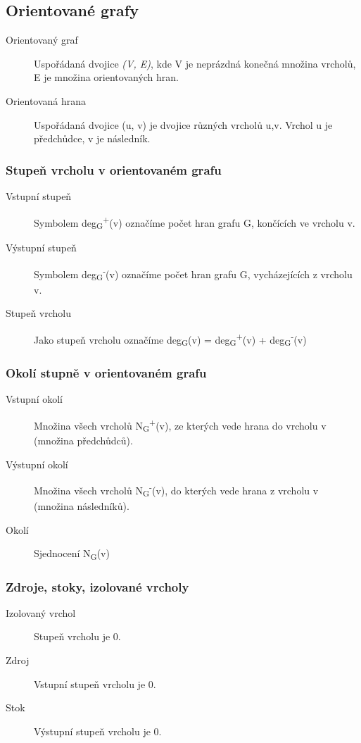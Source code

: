   \subsection{Orientované grafy}

    \begin{description}
      \item[Orientovaný graf] Uspořádaná dvojice \emph{(V, E)}, kde V je neprázdná konečná množina vrcholů, E je množina orientovaných hran.
      \item[Orientovaná hrana] Uspořádaná dvojice (u, v) je dvojice různých vrcholů u,v. Vrchol u je předchůdce, v je následník.
    \end{description}

    \subsubsection{Stupeň vrcholu v orientovaném grafu}
      \begin{description}
        \item[Vstupní stupeň] Symbolem deg\textsubscript{G}\textsuperscript{+}(v) označíme počet hran grafu G, končících ve vrcholu v.
        \item[Výstupní stupeň] Symbolem deg\textsubscript{G}\textsuperscript{-}(v) označíme počet hran grafu G, vycházejících z vrcholu v.
        \item[Stupeň vrcholu] Jako stupeň vrcholu označíme deg\textsubscript{G}(v) = deg\textsubscript{G}\textsuperscript{+}(v) + deg\textsubscript{G}\textsuperscript{-}(v)
      \end{description}

    \subsubsection{Okolí stupně v orientovaném grafu}
      \begin{description}
        \item[Vstupní okolí] Množina všech vrcholů N\textsubscript{G}\textsuperscript{+}(v), ze kterých vede hrana do vrcholu v (množina předchůdců).
        \item[Výstupní okolí] Množina všech vrcholů N\textsubscript{G}\textsuperscript{-}(v), do kterých vede hrana z vrcholu v (množina následníků).
        \item[Okolí] Sjednocení N\textsubscript{G}(v)
      \end{description}

    \subsubsection{Zdroje, stoky, izolované vrcholy}
      \begin{description}
        \item[Izolovaný vrchol] Stupeň vrcholu je 0.
        \item[Zdroj] Vstupní stupeň vrcholu je 0.
        \item[Stok] Výstupní stupeň vrcholu je 0.
      \end{description}


